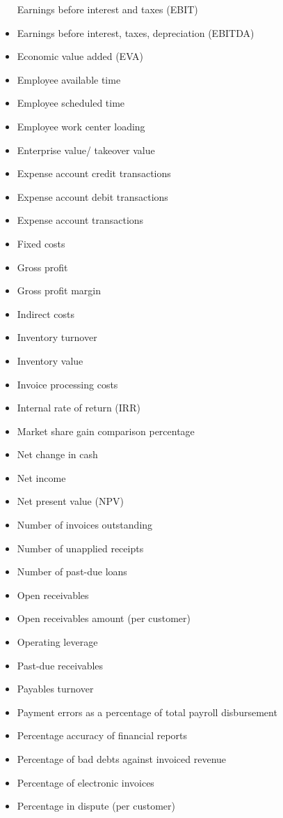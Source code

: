\documentclass[]{book}
\begin{document}
\begin{itemize}
  Earnings before interest and taxes (EBIT)
\item
  Earnings before interest, taxes, depreciation (EBITDA)
\item
  Economic value added (EVA)
\item
  Employee available time
\item
  Employee scheduled time
\item
  Employee work center loading
\item
  Enterprise value/ takeover value
\item
  Expense account credit transactions
\item
  Expense account debit transactions
\item
  Expense account transactions
\item
  Fixed costs
\item
  Gross profit
\item
  Gross profit margin
\item
  Indirect costs
\item
  Inventory turnover
\item
  Inventory value
\item
  Invoice processing costs
\item
  Internal rate of return (IRR)
\item
  Market share gain comparison percentage
\item
  Net change in cash
\item
  Net income
\item
  Net present value (NPV)
\item
  Number of invoices outstanding
\item
  Number of unapplied receipts
\item
  Number of past-due loans
\item
  Open receivables
\item
  Open receivables amount (per customer)
\item
  Operating leverage
\item
  Past-due receivables
\item
  Payables turnover
\item
  Payment errors as a percentage of total payroll disbursement
\item
  Percentage accuracy of financial reports
\item
  Percentage of bad debts against invoiced revenue
\item
  Percentage of electronic invoices
\item
  Percentage in dispute (per customer)

\end{itemize}
\end{document}
